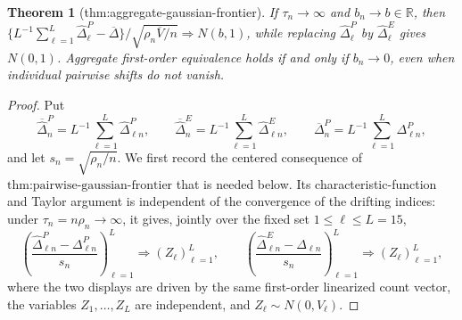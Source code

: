 \documentclass{article}
\newtheorem{theorem}{Theorem}
\begin{document}
\begin{theorem}[thm:aggregate-gaussian-frontier]\label{thm:aggregate-gaussian-frontier}
If \(\tau_n\to\infty\) and \(b_n\to b\in\mathbb R\), then \(\{L^{-1}\sum_{\ell=1}^{L}\widehat\Delta^P_{\ell}-\overline\Delta\}/\sqrt{\rho_n\overline V/n}\Rightarrow N(b,1)\), while replacing \(\widehat\Delta^P_{\ell}\) by \(\widehat\Delta^E_{\ell}\) gives \(N(0,1)\). Aggregate first-order equivalence holds if and only if \(b_n\to0\), even when individual pairwise shifts do not vanish.
\end{theorem}
\begin{proof}
Put
\[
 \overline{\widehat\Delta}^{P}_{n}
   =L^{-1}\sum_{\ell=1}^{L}\widehat\Delta^{P}_{\ell n},
 \qquad
 \overline{\widehat\Delta}^{E}_{n}
   =L^{-1}\sum_{\ell=1}^{L}\widehat\Delta^{E}_{\ell n},
 \qquad
 \overline\Delta^{P}_{n}
   =L^{-1}\sum_{\ell=1}^{L}\Delta^{P}_{\ell n},
\]
and let \(s_n=\sqrt{\rho_n/n}\).  We first record the centered consequence of
\(\text{thm:pairwise-gaussian-frontier}\) that is needed below.  Its
characteristic-function and Taylor argument is independent of the convergence
of the drifting indices: under \(\tau_n=n\rho_n\to\infty\), it gives, jointly
over the fixed set \(1\leq\ell\leq L=15\),
\[
 \left(
   \frac{\widehat\Delta^{P}_{\ell n}-\Delta^{P}_{\ell n}}{s_n}
 \right)_{\ell=1}^{L}
 \Rightarrow (Z_\ell)_{\ell=1}^{L},
 \qquad
 \left(
   \frac{\widehat\Delta^{E}_{\ell n}-\Delta_{\ell n}}{s_n}
 \right)_{\ell=1}^{L}
 \Rightarrow (Z_\ell)_{\ell=1}^{L},
 \tag{1}
\]
where the two displays are driven by the same first-order linearized count
vector, the variables \(Z_1,\ldots,Z_L\) are independent, and
\(Z_\ell\sim N(0,V_\ell)\).


\end{proof}
\end{document}
